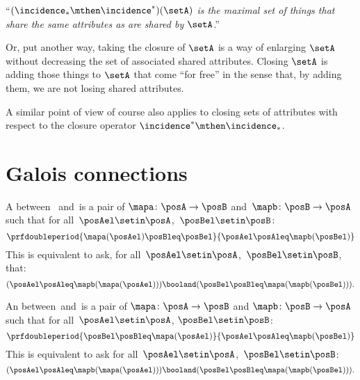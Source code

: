  ``\emph{$(\incidence_* \mthen \incidence^*)(\setA)$ is the maximal set of things that share the same attributes as are shared by $\setA$}.'' 
 
Or, put another way, taking the closure of $\setA$ is a way of enlarging $\setA$ without decreasing the set of associated shared attributes. Closing $\setA$ is adding those things to $\setA$ that come ``for free'' in the sense that, by adding them, we are not losing shared attributes. 

A similar point of view of course also applies to closing sets of attributes with respect to the closure operator $\incidence^* \mthen \incidence_*$.


\section{Galois connections}\label{sec:galois-connections}

\begin{ctdefinition}\label{def:monotone-galois-connection}
    A  between ~\posA and~\posB is a pair of 
    $\mapa\colon \posA\to \posB$ and~$\mapb\colon \posB\to \posA$ such that for all~$\posAel\setin \posA$,~$\posBel\setin \posB$:
    \begin{equation}
        \prfdoubleperiod{\mapa(\posAel) \posBleq \posBel}{\posAel \posAleq \mapb(\posBel)}
    \end{equation}
    This is equivalent to ask, for all~$\posAel\setin \posA$,~$\posBel\setin \posB$, that:
    \begin{equation}
        (\posAel\posAleq \mapb(\mapa(\posAel)))
        \booland (\posBel\posBleq \mapa(\mapb(\posBel))).
    \end{equation}
\end{ctdefinition}

\begin{ctdefinition}\label{def:antitone-galois-connection}
    An  between~\posA and~\posB is a pair of  $\mapa\colon \posA\to \posB$ and $\mapb \colon \posB\to \posA$ such that for all~$\posAel\setin \posA$, $\posBel\setin \posB$:
    \begin{equation}
        \prfdoubleperiod{\posBel \posBleq \mapa(\posAel)}{\posAel \posAleq \mapb(\posBel)}
    \end{equation}
    This is equivalent to ask for all~$\posAel\setin \posA$,~$\posBel\setin \posB$:
    \begin{equation}
        (\posAel \posAleq \mapb(\mapa(\posAel)))
        \booland (\posBel \posBleq \mapa(\mapb(\posBel))).
    \end{equation}
\end{ctdefinition}

